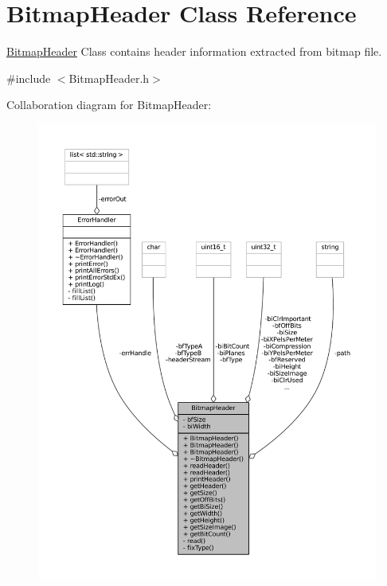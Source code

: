 \hypertarget{classBitmapHeader}{}\section{Bitmap\+Header Class Reference}
\label{classBitmapHeader}


\mbox{\hyperlink{classBitmapHeader}{Bitmap\+Header}} Class contains header information extracted from bitmap file.  




{\ttfamily \#include $<$Bitmap\+Header.\+h$>$}



Collaboration diagram for Bitmap\+Header\+:\nopagebreak
\begin{figure}[H]
\begin{center}
\leavevmode
\includegraphics[width=350pt]{classBitmapHeader__coll__graph}
\end{center}
\end{figure}

